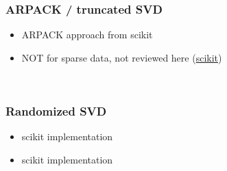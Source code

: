 
\subsubsection{ARPACK / truncated SVD}

\begin{itemize}
	\item \cite{wright2001large} ARPACK approach from scikit
	\item NOT for sparse data, not reviewed here (\href{https://scikit-learn.org/stable/modules/generated/sklearn.decomposition.PCA.html}{scikit})
\end{itemize}

\ \clearpage
\ \clearpage


\subsubsection{Randomized SVD}

\begin{itemize}
	\item \cite{halko2011finding} scikit implementation
	\item \cite{martinsson2011randomized} scikit implementation
\end{itemize}

\ \clearpage
\ \clearpage

